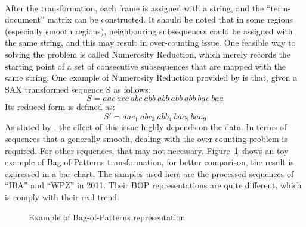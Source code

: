 \\After the transformation, each frame is assigned with a string, and the ``term-document'' matrix can be constructed. It should be noted that in some regions (especially smooth regions), neighbouring subsequences could be assigned with the same string, and this may result in over-counting issue. One feasible way to solving the problem is called Numerosity Reduction, which merely records the starting point of a set of consecutive subsequences that are mapped with the same string. One example of Numerosity Reduction provided by \cite{lin2007experiencing} is that, given a SAX transformed sequence S as follows:
\begin{equation}\nonumber
    S = aac~acc~abc~abb~abb~abb~abb~bac~baa
\end{equation}
Its reduced form is defined as:
\begin{equation}\nonumber
    S\prime = aac_1~abc_3~abb_4~bac_8~baa_9
\end{equation}
As stated by \cite{lin2012rotation}, the effect of this issue highly depends on the data. In terms of sequences that a generally smooth, dealing with the over-counting problem is required. For other sequences, that may not necessary. Figure~\ref{fig:bop1} shows an toy example of Bag-of-Patterns transformation, for better comparison, the result is expressed in a bar chart. The samples used here are the processed sequences of ``IBA'' and ``WPZ'' in 2011. Their BOP representations are quite different, which is comply with their real trend. 
\begin{figure}[!htbp]
    \centering 
    \caption{Example of Bag-of-Patterns representation} 
    \label{fig:bop1} 
\end{figure} 

